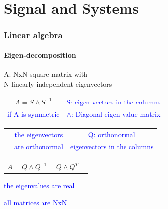 \documentclass[hyperref={pdfpagelabels=true}]{beamer}
\begin{document}
\section{Signal and Systems}

\begin{frame}
\frametitle{Linear algebra}
\framesubtitle{Eigen-decomposition}
\begin{tcolorbox}[width=\textwidth,colback={mygray!20},title={},outer arc=0.01mm,colupper=black]    
A: NxN square matrix with \\
N linearly independent eigenvectors \\
\begin{tabular}{c c}
\colorbox{red!85}{$A=S\wedge S^{-1}$} & \textcolor{blue}{S: eigen vectors in the columns} \\
\textcolor{blue}{if A is symmetric} & \textcolor{blue}{$\wedge$: Diagonal eigen value matrix}
\end{tabular}
\end{tcolorbox} 

\begin{tcolorbox}[width=\textwidth,colback={mygray!20},title={},outer arc=0.01mm,colupper=black]   
{\tiny{ 
\begin{tabular}{c c c}
\quad & \textcolor{blue}{the eigenvectors}  &  \textcolor{blue}{Q: orthonormal}  \\
\quad & \textcolor{blue}{are orthonormal} &  \textcolor{blue}{eigenvectors in the columns} \\
\end{tabular}}}
\begin{tabular}{c c}
$A=Q\wedge Q^{-1}=Q\wedge Q^{T}$ &\hfill \\
\end{tabular}
\end{tcolorbox} 

\begin{tcolorbox}[width=\textwidth,colback={mygray!20},title={},outer arc=0.01mm,colupper=black]   
 \textcolor{blue}{the eigenvalues are real}
\end{tcolorbox}
\begin{center}
 \textcolor{blue}{all matrices are NxN}
\end{center}
\end{frame}
\end{document}
